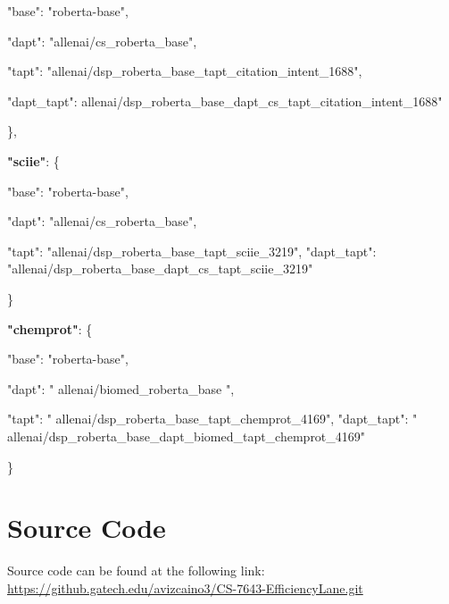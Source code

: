 \documentclass[draft,10pt,twocolumn,letterpaper]{article}
\begin{document}
        "base": "roberta-base",
        
        "dapt": "allenai/cs\_roberta\_base",
        
        "tapt":         "allenai/dsp\_roberta\_base\_tapt\_citation\_intent\_1688",
        
        "dapt\_tapt": allenai/dsp\_roberta\_base\_dapt\_cs\_tapt\_citation\_intent\_1688"
        
    \},

    \textbf{"sciie"}: \{
    
        "base": "roberta-base",
        
        "dapt": "allenai/cs\_roberta\_base",
        
        "tapt": "allenai/dsp\_roberta\_base\_tapt\_sciie\_3219",
        "dapt\_tapt": 
        "allenai/dsp\_roberta\_base\_dapt\_cs\_tapt\_sciie\_3219"
        
    \}
    
\textbf{"chemprot"}: \{

        "base": "roberta-base",
        
        "dapt": " allenai/biomed\_roberta\_base ",
        
        "tapt": " allenai/dsp\_roberta\_base\_tapt\_chemprot\_4169",
        "dapt\_tapt": " 
        allenai/dsp\_roberta\_base\_dapt\_biomed\_tapt\_chemprot\_4169"
        
    \}
    


\section{Source Code}
Source code can be found at the following link:
\href{https://github.gatech.edu/avizcaino3/CS-7643-EfficiencyLane.git}{https://github.gatech.edu/avizcaino3/CS-7643-EfficiencyLane.git}

% 
% 
\end{document}
